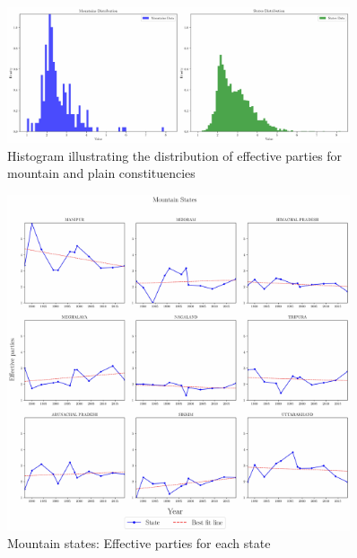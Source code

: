 \begin{figure}[htbp]
    \centering
    \includegraphics[width=0.9\textwidth]{figures/lok/histogram.pdf}
    \caption{Histogram illustrating the distribution of effective parties for mountain and plain constituencies}
    \label{img:histogram}
\end{figure}

\begin{figure}[htbp]
    \centering
    \includegraphics[width=0.9\textwidth]{figures/lok/mountain_states.pdf}
    \caption{Mountain states: Effective parties for each state}
    \label{img:mountain_enp}
\end{figure}

